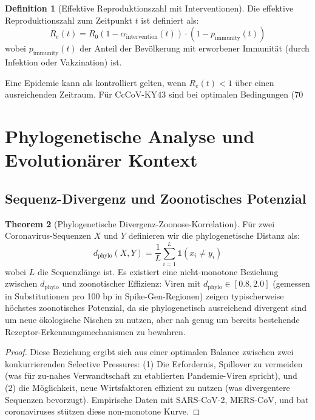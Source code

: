 ﻿\documentclass[11pt,a4paper]{article}
\theoremstyle{definition}
\newtheorem{theorem}{Theorem}[section]
\newtheorem{definition}[theorem]{Definition}
\begin{document}
\begin{definition}[Effektive Reproduktionszahl mit Interventionen]
Die effektive Reproduktionszahl zum Zeitpunkt $t$ ist definiert als:
\[
R_e(t) = R_0 (1 - \alpha_{\text{intervention}}(t)) \cdot (1 - p_{\text{immunity}}(t))
\]
wobei $p_{\text{immunity}}(t)$ der Anteil der Bevölkerung mit erworbener Immunität (durch Infektion oder Vakzination) ist.
\end{definition}

Eine Epidemie kann als kontrolliert gelten, wenn $R_e(t) < 1$ über einen ausreichenden Zeitraum. Für CcCoV-KY43 sind bei optimalen Bedingungen (70%

\section{Phylogenetische Analyse und Evolutionärer Kontext}

\subsection{Sequenz-Divergenz und Zoonotisches Potenzial}

\begin{theorem}[Phylogenetische Divergenz-Zoonose-Korrelation]
\label{thm:phylo_zoonosis}
Für zwei Coronavirus-Sequenzen $X$ und $Y$ definieren wir die phylogenetische Distanz als:
\[
d_{\text{phylo}}(X, Y) = \frac{1}{L} \sum_{i=1}^{L} \mathbb{1}(x_i \neq y_i)
\]
wobei $L$ die Sequenzlänge ist. Es existiert eine nicht-monotone Beziehung zwischen $d_{\text{phylo}}$ und zoonotischer Effizienz: Viren mit $d_{\text{phylo}} \in [0.8, 2.0]$ (gemessen in Substitutionen pro 100 bp in Spike-Gen-Regionen) zeigen typischerweise höchstes zoonotisches Potenzial, da sie phylogenetisch ausreichend divergent sind um neue ökologische Nischen zu nutzen, aber nah genug um bereits bestehende Rezeptor-Erkennungsmechanismen zu bewahren.
\end{theorem}

\begin{proof}
Diese Beziehung ergibt sich aus einer optimalen Balance zwischen zwei konkurrierenden Selective Pressures: (1) Die Erfordernis, Spillover zu vermeiden (was für zu-nahes Verwandtschaft zu etablierten Pandemie-Viren spricht), und (2) die Möglichkeit, neue Wirtsfaktoren effizient zu nutzen (was divergentere Sequenzen bevorzugt). Empirische Daten mit SARS-CoV-2, MERS-CoV, und bat coronaviruses stützen diese non-monotone Kurve.
\end{proof}
\end{document}
